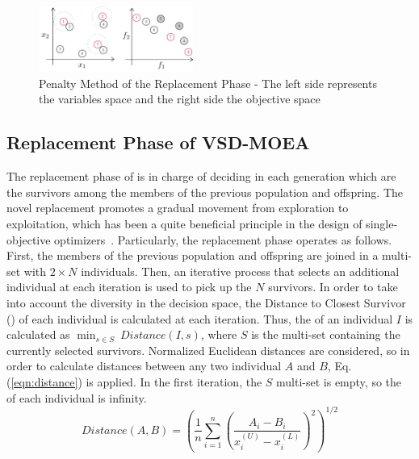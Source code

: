 \begin{figure}[t]
\centering
%
%
\includegraphics[width=0.45\textwidth]{Images/Diagram.pdf}
\caption{Penalty Method of the Replacement Phase - The left side represents the variables space and the right side the 
objective space} \label{fig:Hypersphere}
\end{figure}


\subsection{Replacement Phase of VSD-MOEA}

The replacement phase of \EAS{} is in charge of deciding in each generation which are the survivors 
among the members of the previous population and offspring.
%
The novel replacement promotes a gradual movement from exploration to exploitation, which has been a quite 
beneficial principle in the design of single-objective optimizers~\cite{Joel:MULTI_DYNAMIC}.
%
Particularly, the replacement phase operates as follows.
%
First, the members of the previous population and offspring are joined in a multi-set with $2 \times N$ individuals.
%
%
%
Then, an iterative process that selects an additional
individual at each iteration is used to pick up the $N$ survivors. 
%
In order to take into account the diversity in the decision space, the Distance to Closest Survivor (\DCS{}) of each
individual is calculated at each iteration.
%
Thus, the \DCS{} of an individual $I$ is calculated as $\displaystyle{\min_{s \in S}\ Distance(I, s)}$,
where $S$ is the multi-set containing the currently selected survivors. 
%
Normalized Euclidean distances are considered, so in order to calculate distances between any two individual $A$ and $B$, 
Eq. (\ref{eqn:distance}) is applied.
%
In the first iteration, the $S$ multi-set is empty, so the \DCS{} of each individual is infinity.
%
\begin{equation}\label{eqn:distance}
Distance(A, B) =   \left ( \frac{1}{n}  \sum_{i=1}^n \left ( \frac{A_i - B_i}{x_i^{(U)} - x_i^{(L)}} \right )^2  \right)^{1/2}
\end{equation}

